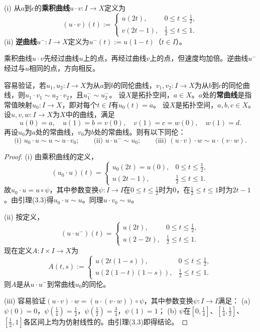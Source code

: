 (i) 从$a$到$c$的\textbf{乘积曲线}$u\cdot v:I\to X$定义为
\[
(u\cdot v)(t):=\begin{cases}u(2t),&0\le t\le\tfrac12,\\v(2t-1),&\tfrac12\le t\le1.\end{cases}
\]
(ii) \textbf{逆曲线}$u^-:I\to X$定义为$u^-(t):=u(1-t)$（$t\in I$）。

乘积曲线$u\cdot v$先经过曲线$u$上的点，再经过曲线$v$上的点，但速度均加倍。逆曲线$u^-$经过与$u$相同的点，方向相反。

容易验证，若$u_1,u_2:I\to X$为从$a$到$b$的同伦曲线，$v_1,v_2:I\to X$为从$b$到$c$的同伦曲线，则$u_1\cdot v_1\sim u_2\cdot v_2$，且$u_1^-\sim u_2^-$。
设$X$是拓扑空间，$a\in X$。$a$处的\textbf{常曲线}是指常值映射$u_0:I\to X$，即对每个$t\in I$有$u_0(t)=a$。
设$X$是拓扑空间，$a,b,c\in X$。设$u,v,w:I\to X$为$X$中的曲线，满足
\[
u(0)=a,\quad u(1)=b=v(0),\quad v(1)=c=w(0),\quad w(1)=d.
\]
再设$u_0$为$a$处的常曲线，$v_0$为$b$处的常曲线。则有以下同伦：
\[
\text{(i) }u_0\cdot u\sim u\sim u\cdot v_0;\qquad
\text{(ii) }u\cdot u^-\sim u_0;\qquad
\text{(iii) }(u\cdot v)\cdot w\sim u\cdot(v\cdot w).
\]
\begin{proof}
(i) 由乘积曲线的定义，
\[
(u_0\cdot u)(t)=\begin{cases}u_0(2t)=u(0),&0\le t\le\tfrac12,\\u(2t-1),&\tfrac12\le t\le1.\end{cases}
\]
故$u_0\cdot u=u\circ\psi$，其中参数变换$\psi:I\to I$在$0\le t\le\tfrac12$时为0，在$\tfrac12\le t\le1$时为$2t-1$。由引理(3.3)得$u_0\cdot u\sim u$。同理$u\cdot v_0\sim u$。

(ii) 按定义，
\[
(u\cdot u^-)(t)=\begin{cases}u(2t),&0\le t\le\tfrac12,\\u(2-2t),&\tfrac12\le t\le1.\end{cases}
\]
现在定义$A:I\times I\to X$为
\[
A(t,s):=\begin{cases}u(2t(1-s)),&0\le t\le\tfrac12,\\u(2(1-t)(1-s)),&\tfrac12\le t\le1.\end{cases}
\]
则$A$是从$u\cdot u^-$到常曲线$u_0$的同伦。

(iii) 容易验证$(u\cdot v)\cdot w=(u\cdot(v\cdot w))\circ\psi$，其中参数变换$\psi:I\to I$满足：
(a) $\psi(0)=0$，$\psi(\tfrac14)=\tfrac12$，$\psi(\tfrac12)=\tfrac34$，$\psi(1)=1$；
(b) $\psi$在$[0,\tfrac14]$、$[\tfrac14,\tfrac12]$、$[\tfrac12,1]$各区间上均为仿射线性的。由引理(3.3)即得结论。
\end{proof}

